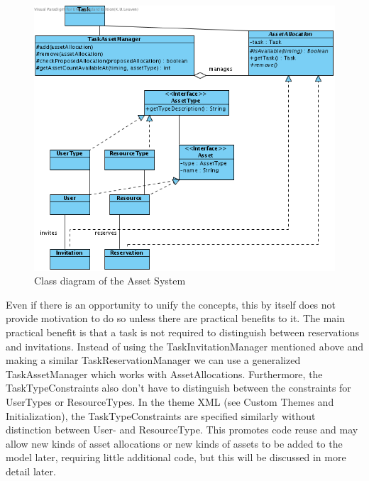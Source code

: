 				\begin{figure}
			\includegraphics[scale=0.5]{images/Asset.png}
			\caption{Class diagram of the Asset System}
						\label{asset}
			\end{figure}
				
				
				Even if there is an opportunity to unify the concepts, this by itself does not provide motivation to do so unless there are practical benefits to it. The main practical benefit is that a task is not required to distinguish between reservations and invitations. Instead of using the TaskInvitationManager mentioned above and making a similar TaskReservationManager we can use a generalized TaskAssetManager which works with AssetAllocations. Furthermore, the TaskTypeConstraints also don't have to distinguish between the constraints for UserTypes or ResourceTypes. In the theme XML (see Custom Themes and Initialization), the TaskTypeConstraints are specified similarly without distinction between User- and ResourceType. This promotes code reuse and may allow new kinds of asset allocations or new kinds of assets to be added to the model later, requiring little additional code, but this will be discussed in more detail later.

